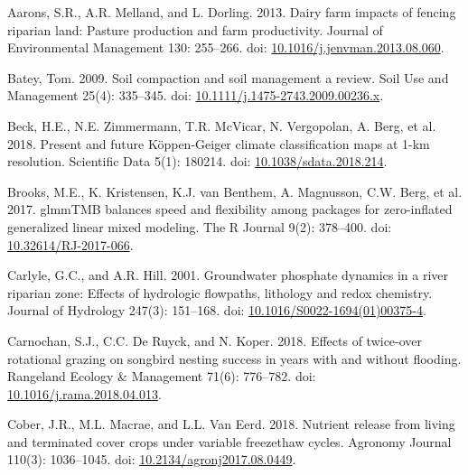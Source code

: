 \documentclass[
]{agujournal2019}
\newlength{\cslhangindent}
\newenvironment{CSLReferences}[2] %
 {\begin{list}{}{%
  \setlength{\itemindent}{0pt}
  \setlength{\leftmargin}{0pt}
  \setlength{\parsep}{0pt}
  \ifodd #1
   \setlength{\leftmargin}{\cslhangindent}
   \setlength{\itemindent}{-1\cslhangindent}
  \fi
  \setlength{\itemsep}{#2\baselineskip}}}
 {\end{list}}
\begin{document}
\label{refs}
\begin{CSLReferences}{1}{1}
\vspace{1em}

Aarons, S.R., A.R. Melland, and L. Dorling. 2013. Dairy farm impacts of
fencing riparian land: Pasture production and farm productivity. Journal
of Environmental Management 130: 255--266. doi:
\href{https://doi.org/10.1016/j.jenvman.2013.08.060}{10.1016/j.jenvman.2013.08.060}.

Batey, Tom. 2009. Soil compaction and soil management {\textendash} a
review. Soil Use and Management 25(4): 335--345. doi:
\href{https://doi.org/10.1111/j.1475-2743.2009.00236.x}{10.1111/j.1475-2743.2009.00236.x}.

Beck, H.E., N.E. Zimmermann, T.R. McVicar, N. Vergopolan, A. Berg, et
al. 2018. Present and future Köppen-Geiger climate classification maps
at 1-km resolution. Scientific Data 5(1): 180214. doi:
\href{https://doi.org/10.1038/sdata.2018.214}{10.1038/sdata.2018.214}.

Brooks, M.E., K. Kristensen, K.J. van Benthem, A. Magnusson, C.W. Berg,
et al. 2017. {glmmTMB} balances speed and flexibility among packages for
zero-inflated generalized linear mixed modeling. The R Journal 9(2):
378--400. doi:
\href{https://doi.org/10.32614/RJ-2017-066}{10.32614/RJ-2017-066}.

Carlyle, G.C., and A.R. Hill. 2001. Groundwater phosphate dynamics in a
river riparian zone: Effects of hydrologic flowpaths, lithology and
redox chemistry. Journal of Hydrology 247(3): 151--168. doi:
\href{https://doi.org/10.1016/S0022-1694(01)00375-4}{10.1016/S0022-1694(01)00375-4}.

Carnochan, S.J., C.C. De Ruyck, and N. Koper. 2018. Effects of
twice-over rotational grazing on songbird nesting success in years with
and without flooding. Rangeland Ecology \& Management 71(6): 776--782.
doi:
\href{https://doi.org/10.1016/j.rama.2018.04.013}{10.1016/j.rama.2018.04.013}.

Cober, J.R., M.L. Macrae, and L.L. Van Eerd. 2018. Nutrient release from
living and terminated cover crops under variable freeze{\textendash}thaw
cycles. Agronomy Journal 110(3): 1036--1045. doi:
\href{https://doi.org/10.2134/agronj2017.08.0449}{10.2134/agronj2017.08.0449}.


\end{CSLReferences}
\end{document}
